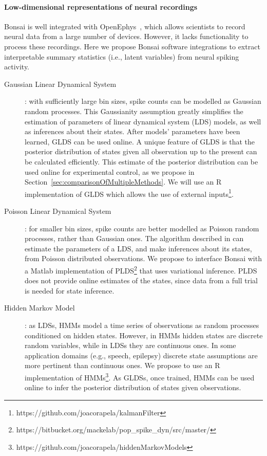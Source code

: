 \paragraph{Low-dimensional representations of neural recordings}
\label{sec:lowDimensionalRepresentation}

Bonsai is well integrated with OpenEphys~\citep{siegleEtAl17}, which allows
scientists to record neural data from a large number of devices. However, it
lacks functionality to process these recordings. Here we propose Bonsai software integrations to extract interpretable summary statistics
(i.e., latent variables) from neural spiking activity.

\begin{description}

    \item[Gaussian Linear Dynamical
        System]\citep[(GLDS)][]{andersonAndMoore12}: with sufficiently large
        bin sizes, spike counts can be modelled as Gaussian random processes.
        This Gaussianity assumption greatly simplifies the estimation of
        parameters of linear dynamical system (LDS) models, as well as
        inferences about their states. After models' parameters have been
        learned, GLDS can be used online. A unique feature of GLDS is that the
        posterior distribution of states given all observation up to the
        present can be calculated efficiently. This estimate of the posterior
        distribution can be used online for experimental control, as we
        propose in Section~\ref{sec:comparisonOfMultipleMethods}. We will use an R implementation of GLDS
        which allows the use of external
        inputs\footnote{https://github.com/joacorapela/kalmanFilter}.

    \item[Poisson Linear Dynamical System]\citep[PLDS][]{mackeEtAl15}: for
        smaller bin sizes, spike counts are better modelled as Poisson random
        processes, rather than Gaussian ones. The algorithm described in
        \citet{mackeEtAl15} can estimate the parameters of a LDS, and make
        inferences about its states, from Poisson distributed observations.  We
        propose to interface Bonsai with a Matlab implementation of
        PLDS\footnote{https://bitbucket.org/mackelab/pop\_spike\_dyn/src/master/}
        that uses variational inference. PLDS does not provide online estimates
        of the states, since data from a full trial is needed for state
        inference.

    \item[Hidden Markov Model]\citep[HMM;][]{rabiner89}: as LDSs, HMMs model a
        time series of observations as random processes conditioned on hidden
        states. However, in HMMs hidden states are discrete random variables,
        while in LDSs they are continuous ones. In some application domains
        (e.g., speech, epilepsy) discrete state assumptions are more pertinent
        than continuous ones. We propose to use an R implementation of
        HMMs\footnote{https://github.com/joacorapela/hiddenMarkovModels}.
        As GLDSs, once trained, HMMs can be used online to infer the posterior
        distribution of states given observations.


\end{description}

